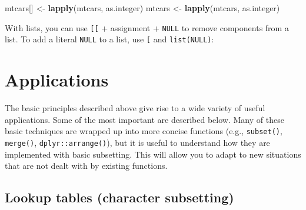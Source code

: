 \documentclass[]{book}
\newenvironment{Shaded}{\begin{snugshade}}{\end{snugshade}}
\newcommand{\KeywordTok}[1]{\textcolor[rgb]{0.13,0.29,0.53}{\textbf{#1}}}
\newcommand{\DataTypeTok}[1]{\textcolor[rgb]{0.13,0.29,0.53}{#1}}
\newcommand{\DecValTok}[1]{\textcolor[rgb]{0.00,0.00,0.81}{#1}}
\newcommand{\StringTok}[1]{\textcolor[rgb]{0.31,0.60,0.02}{#1}}
\newcommand{\CommentTok}[1]{\textcolor[rgb]{0.56,0.35,0.01}{\textit{#1}}}
\newcommand{\OtherTok}[1]{\textcolor[rgb]{0.56,0.35,0.01}{#1}}
\newcommand{\NormalTok}[1]{#1}
\theoremstyle{definition}
\theoremstyle{definition}
\theoremstyle{definition}
\theoremstyle{remark}
\begin{document}
\begin{Shaded}
\begin{Highlighting}[]
\NormalTok{mtcars[] <-}\StringTok{ }\KeywordTok{lapply}\NormalTok{(mtcars, as.integer)}
\NormalTok{mtcars <-}\StringTok{ }\KeywordTok{lapply}\NormalTok{(mtcars, as.integer)}
\end{Highlighting}
\end{Shaded}

With lists, you can use \texttt{{[}{[}} + assignment + \texttt{NULL} to
remove components from a list. To add a literal \texttt{NULL} to a list,
use \texttt{{[}} and \texttt{list(NULL)}:

\begin{Shaded}
\end{Shaded}

\section{Applications}\label{applications}

The basic principles described above give rise to a wide variety of
useful applications. Some of the most important are described below.
Many of these basic techniques are wrapped up into more concise
functions (e.g., \texttt{subset()}, \texttt{merge()},
\texttt{dplyr::arrange()}), but it is useful to understand how they are
implemented with basic subsetting. This will allow you to adapt to new
situations that are not dealt with by existing functions.

\subsection{Lookup tables (character
subsetting)}\label{lookup-tables-character-subsetting}
\end{document}
